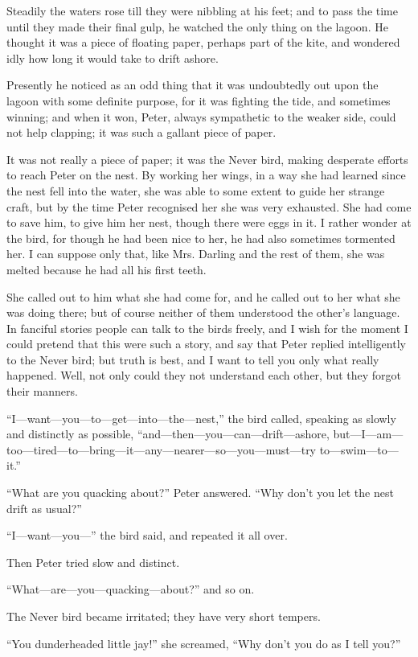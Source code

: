 Steadily the waters rose till they were nibbling at his feet; and to
pass the time until they made their final gulp, he watched the only
thing on the lagoon. He thought it was a piece of floating paper,
perhaps part of the kite, and wondered idly how long it would take to
drift ashore.

Presently he noticed as an odd thing that it was undoubtedly out upon
the lagoon with some definite purpose, for it was fighting the tide,
and sometimes winning; and when it won, Peter, always sympathetic to
the weaker side, could not help clapping; it was such a gallant piece
of paper.

It was not really a piece of paper; it was the Never bird, making
desperate efforts to reach Peter on the nest. By working her wings, in
a way she had learned since the nest fell into the water, she was able
to some extent to guide her strange craft, but by the time Peter
recognised her she was very exhausted. She had come to save him, to
give him her nest, though there were eggs in it. I rather wonder at the
bird, for though he had been nice to her, he had also sometimes
tormented her. I can suppose only that, like Mrs. Darling and the rest
of them, she was melted because he had all his first teeth.

She called out to him what she had come for, and he called out to her
what she was doing there; but of course neither of them understood the
other's language. In fanciful stories people can talk to the birds
freely, and I wish for the moment I could pretend that this were such a
story, and say that Peter replied intelligently to the Never bird; but
truth is best, and I want to tell you only what really happened. Well,
not only could they not understand each other, but they forgot their
manners.

``I—want—you—to—get—into—the—nest,'' the bird called, speaking as slowly
and distinctly as possible, ``and—then—you—can—drift—ashore,
but—I—am—too—tired—to—bring—it—any—nearer—so—you—must—try
to—swim—to—it.''

``What are you quacking about?'' Peter answered. ``Why don't you let the
nest drift as usual?''

``I—want—you—'' the bird said, and repeated it all over.

Then Peter tried slow and distinct.

``What—are—you—quacking—about?'' and so on.

The Never bird became irritated; they have very short tempers.

``You dunderheaded little jay!'' she screamed, ``Why don't you do as I
tell you?''

